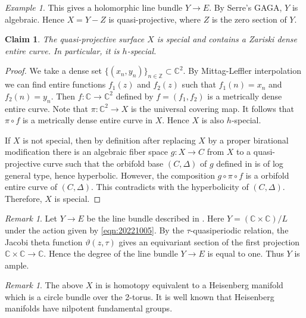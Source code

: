 \documentclass[11pt,english]{smfart}
\theoremstyle{plain}
\newtheorem{claim}[thm]{Claim}
\theoremstyle{definition}
\theoremstyle{remark}
\newtheorem{rem}[thm]{Remark}
\newtheorem{example}[thm]{Example}
\numberwithin{equation}{subsection}
\theoremstyle{plain}
\newcommand{\bC}{\mathbb{C}}
\newcommand{\bZ}{\mathbb{Z}}
\begin{document}
\begin{example}
	This gives a holomorphic line bundle $Y\to E$. 
	By Serre's GAGA, $Y$ is algebraic.
	Hence $X=Y-Z$ is quasi-projective, where $Z$ is the zero section of $Y$. 
	\begin{claim}
		The quasi-projective surface $X$ is special and contains a Zariski dense entire curve. In particular, it is $h$-special.
	\end{claim}
	\begin{proof}
We take a dense set $\{(x_n,y_n)\}_{n\in \bZ}\subset  \bC^2$. By  Mittag-Leffler interpolation we can find entire functions $f_1(z)$ and $f_2(z)$   such that $f_1(n)=x_n$ and   $f_2(n)=y_n$. Then $f:\bC\to \bC^2$ defined by $f=(f_1,f_2)$ is a metrically dense entire curve. 
	Note that $\pi:\bC^2\to X$ is the universal covering map. It follows that $\pi\circ f$  is  a metrically dense entire curve in  $X$. Hence $X$ is also $h$-special. 
	
	If $X$ is not special, then  by definition after replacing $X$ by a proper birational modification  there is an algebraic fiber space $g:X\to C$ from $X$ to a  quasi-projective curve such that the orbifold base $(C,\Delta)$ of $g$ defined in \cite{Cam11} is of log general type, hence hyperbolic.  However, the composition $g\circ \pi\circ f$ is a orbifold entire curve of  $(C,\Delta)$. This contradicts with the hyperbolicity of $(C,\Delta)$.  Therefore, $X$ is special. 
	\end{proof}
	
\end{example} 


\begin{rem}\label{re:20230428}
Let $Y\to E$ be the line bundle described in .
Here $Y=(\mathbb C\times \mathbb C)/L$ under the action given by \eqref{eqn:20221005}.
By the $\tau$-quasiperiodic relation, the Jacobi theta function $\vartheta(z,\tau)$ gives an equivariant section of the first projection $\mathbb C\times \mathbb C\to \mathbb C$.
		Hence the degree of the line bundle $Y\to E$ is equal to one.
Thus $Y$ is ample.
\end{rem}




\begin{rem}
The above $X$ in  is homotopy equivalent to a Heisenberg manifold which is a circle bundle over the 2-torus.
It is well known that Heisenberg manifolds have nilpotent fundamental groups.
\end{rem}


\end{document}
